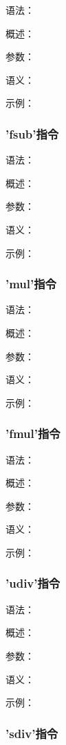 \documentclass[12pt,a4paper]{article}
\begin{document}
{语法：

概述：

参数：

语义：

示例：


\subsubsection{'fsub'指令} %

语法：

概述：

参数：

语义：

示例：


\subsubsection{'mul'指令} %

语法：

概述：

参数：

语义：

示例：


\subsubsection{'fmul'指令} %

语法：

概述：

参数：

语义：

示例：


\subsubsection{'udiv'指令} %

语法：

概述：

参数：

语义：

示例：


\subsubsection{'sdiv'指令} %

}
\end{document}
